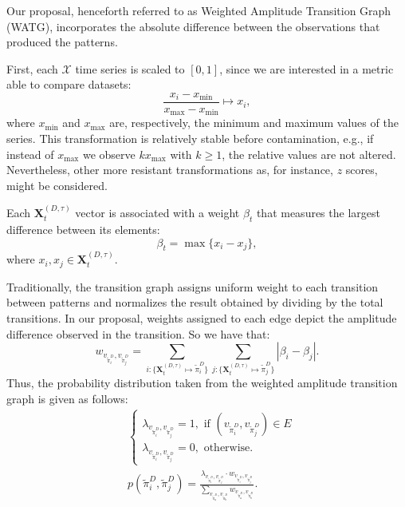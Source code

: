 \documentclass[journal]{IEEEtran}
\begin{document}
Our proposal, henceforth referred to as Weighted Amplitude Transition Graph (WATG), incorporates the absolute difference between the observations that produced the patterns.


First, each $\mathcal{X}$ time series is scaled to $[0, 1]$, since we are interested in a metric able to compare datasets:
\begin{equation}
 \frac{x_i - x_{\min}}{x_{\max} - x_{\min}} \longmapsto x_i,
\end{equation}
where $x_{\min}$ and $x_{\max}$ are, respectively, the minimum and maximum values of the series.
This transformation is relatively stable before contamination, e.g., if instead of $x_{\max}$ we observe $k x_{\max}$ with $k\geq 1$, the relative values are not altered. Nevertheless, other more resistant transformations as, for instance, $z$ scores, might be considered.


Each $\mathbf{X}^{(D, \tau)}_t$ vector is associated with a weight $\beta_t$ that measures the largest difference between its elements:
\begin{equation}
\beta_t = \max\{x_i - x_j\},
\end{equation}
where $x_i, x_j \in \mathbf{X}^{(D, \tau)}_t$.

Traditionally, the transition graph assigns uniform weight to each transition between patterns and normalizes the result obtained by dividing by the total transitions.
In our proposal, %
 weights assigned to each edge depict the amplitude difference observed in the transition.
So we have that:	
\begin{equation}
w_{v_{\widetilde \pi^D_i}, v_{\widetilde \pi^D_j}} =  \sum_{i : \{\mathbf{X}^{(D,\tau)}_t \mapsto \widetilde\pi^D_i\}} \sum_{j : \{\mathbf{X}^{(D,\tau)}_t \mapsto \widetilde\pi^D_j\}} |\beta_i - \beta_j| .
\end{equation}
Thus, the probability distribution taken from the weighted amplitude transition graph is given as follows:	
\begin{align}
&\left\{\begin{array}{l}
\lambda_{v_{\widetilde\pi^D_i}, v_{\widetilde\pi^D_j}} = 1, \text{ if } (v_{\widetilde\pi^D_i}, v_{\widetilde\pi^D_j}) \in {E} \\
\lambda_{v_{\widetilde\pi^D_i}, v_{\widetilde\pi^D_j}} = 0, \text{ otherwise}.
\end{array}\right. \\
%
&p(\widetilde\pi^D_i, \widetilde\pi^D_j) = \frac{\lambda_{v_{\widetilde\pi^D_i}, v_{\widetilde\pi^D_j}} \cdot w_{v_{\widetilde\pi^D_i}, v_{\widetilde\pi^D_j}}}{\sum_{v_{\widetilde\pi^D_a}, v_{\widetilde\pi^D_b}} w_{v_{\widetilde\pi^D_a}, v_{\widetilde\pi^D_b}}}.
\end{align}
\end{document}
